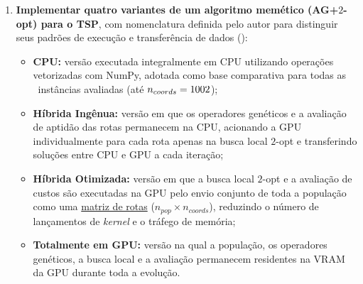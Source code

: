 \begin{enumerate}
      \item
            \textbf{Implementar quatro variantes de um algoritmo memético (AG+\(2\)-opt) para o TSP}, com nomenclatura definida pelo autor para distinguir seus padrões de execução e transferência de dados ():

            \begin{itemize}
                  \item
                        \textbf{CPU:} versão executada integralmente em CPU utilizando operações vetorizadas com NumPy, adotada como base comparativa para todas as \totalinstancias\ instâncias avaliadas (até \(n_{coords} = 1002\));
                  \item
                        \textbf{Híbrida Ingênua:} versão em que os operadores genéticos e a avaliação de aptidão das rotas permanecem na CPU, acionando a GPU individualmente para cada rota apenas na busca local \(2\)-opt e transferindo soluções entre CPU e GPU a cada iteração;
                  \item
                        \textbf{Híbrida Otimizada:} versão em que a busca local \(2\)-opt e a avaliação de custos são executadas na GPU pelo envio conjunto de toda a população como uma \hyperlink{term:batch}{matriz de rotas} (\(n_{pop} \times n_{coords}\)), reduzindo o número de lançamentos de \emph{kernel} e o tráfego de memória;
                  \item
                        \textbf{Totalmente em GPU:} versão na qual a população, os operadores genéticos, a busca local e a avaliação permanecem residentes na VRAM da GPU durante toda a evolução.
            \end{itemize}


\end{enumerate}
